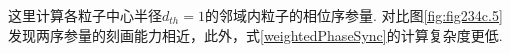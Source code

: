 \documentclass{article}
\begin{document}
\vspace{-0.5cm}
这里计算各粒子中心半径$d_{th}=1$的邻域内粒子的相位序参量.
对比图\ref{fig:fig234c.5}发现两序参量的刻画能力相近，此外，式\ref{weightedPhaseSync}的计算复杂度更低.



		





		
\end{document}
